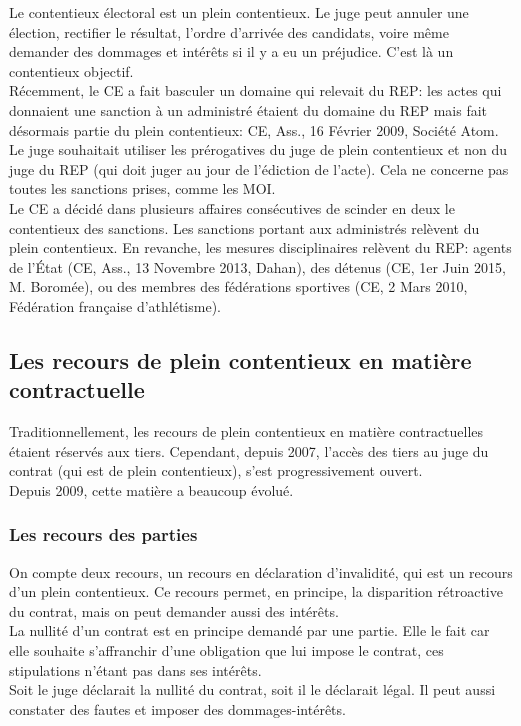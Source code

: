 \documentclass[10pt, a4paper, openany]{book}
\begin{document}
Le contentieux électoral est un plein contentieux. Le juge peut annuler une élection, rectifier le résultat, l'ordre d'arrivée des candidats, voire même demander des dommages et intérêts si il y a eu un préjudice. C'est là un contentieux objectif. \\
Récemment, le CE a fait basculer un domaine qui relevait du REP: les actes qui donnaient une sanction à un administré étaient du domaine du REP mais fait désormais partie du plein contentieux: CE, Ass., 16 Février 2009, Société Atom. Le juge souhaitait utiliser les prérogatives du juge de plein contentieux et non du juge du REP (qui doit juger au jour de l'édiction de l'acte). Cela ne concerne pas toutes les sanctions prises, comme les MOI. \\
Le CE a décidé dans plusieurs affaires consécutives de scinder en deux le contentieux des sanctions. Les sanctions portant aux administrés relèvent du plein contentieux. En revanche, les mesures disciplinaires relèvent du REP: agents de l'État (CE, Ass., 13 Novembre 2013, Dahan), des détenus (CE, 1er Juin 2015, M. Boromée), ou des membres des fédérations sportives (CE, 2 Mars 2010, Fédération française d'athlétisme). 


\subsection{Les recours de plein contentieux en matière contractuelle}

Traditionnellement, les recours de plein contentieux en matière contractuelles étaient réservés aux tiers. Cependant, depuis 2007, l'accès des tiers au juge du contrat (qui est de plein contentieux), s'est progressivement ouvert. \\
Depuis 2009, cette matière a beaucoup évolué.

\subsubsection{Les recours des parties}

On compte deux recours, un recours en déclaration d'invalidité, qui est un recours d'un plein contentieux. Ce recours permet, en principe, la disparition rétroactive du contrat, mais on peut demander aussi des intérêts. \\
La nullité d'un contrat est en principe demandé par une partie. Elle le fait car elle souhaite s'affranchir d'une obligation que lui impose le contrat, ces stipulations n'étant pas dans ses intérêts. \\
Soit le juge déclarait la nullité du contrat, soit il le déclarait légal. Il peut aussi constater des fautes et imposer des dommages-intérêts.
\end{document}
